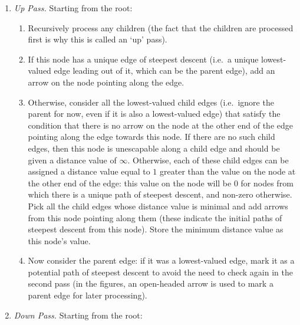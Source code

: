 \documentclass[preprint,a4paper]{elsarticle}
\begin{document}
\begin{enumerate}

\item \emph{Up Pass.} Starting from the root:

\begin{enumerate}
\item Recursively process any children (the fact that the children are processed first is why this is called an `up' pass).
\item If this node has a unique edge of steepest descent (i.e.~a unique lowest-valued edge leading out of it, which can be the parent edge), add an arrow on the node pointing along the edge.
\item Otherwise, consider all the lowest-valued child edges (i.e.~ignore the parent for now, even if it is also a lowest-valued edge) that satisfy the condition that there is no arrow on the node at the other end of the edge pointing along the edge towards this node. If there are no such child edges, then this node is unescapable along a child edge and should be given a distance value of $\infty$. Otherwise, each of these child edges can be assigned a distance value equal to $1$ greater than the value on the node at the other end of the edge: this value on the node will be $0$ for nodes from which there is a unique path of steepest descent, and non-zero otherwise. Pick all the child edges whose distance value is minimal and add arrows from this node pointing along them (these indicate the initial paths of steepest descent from this node). Store the minimum distance value as this node's value.
\item Now consider the parent edge: if it was a lowest-valued edge, mark it as a potential path of steepest descent to avoid the need to check again in the second pass (in the figures, an open-headed arrow is used to mark a parent edge for later processing).
\end{enumerate}

\item \emph{Down Pass.} Starting from the root:


\end{enumerate}
\end{document}

